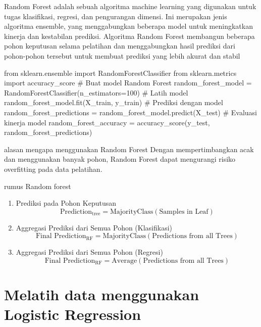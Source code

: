 \documentclass[
  letterpaper,
]{krantz}
\makeatletter
\newenvironment{Shaded}{\begin{snugshade}}{\end{snugshade}}
\newcommand{\CommentTok}[1]{\textcolor[rgb]{0.37,0.37,0.37}{#1}}
\newcommand{\DecValTok}[1]{\textcolor[rgb]{0.68,0.00,0.00}{#1}}
\newcommand{\ImportTok}[1]{\textcolor[rgb]{0.00,0.46,0.62}{#1}}
\newcommand{\NormalTok}[1]{\textcolor[rgb]{0.00,0.23,0.31}{#1}}
\newcommand{\OperatorTok}[1]{\textcolor[rgb]{0.37,0.37,0.37}{#1}}
\newenvironment{kframe}{%
\medskip{}
\setlength{\fboxsep}{.8em}
 \def\at@end@of@kframe{}%
 \ifinner\ifhmode%
  \def\at@end@of@kframe{\end{minipage}}%
  \begin{minipage}{\columnwidth}%
 \fi\fi%
 \def\FrameCommand##1{\hskip\@totalleftmargin \hskip-\fboxsep
 \colorbox{shadecolor}{##1}\hskip-\fboxsep
     \hskip-\linewidth \hskip-\@totalleftmargin \hskip\columnwidth}%
 \MakeFramed {\advance\hsize-\width
   \@totalleftmargin\z@ \linewidth\hsize
   \@setminipage}}%
 {\par\unskip\endMakeFramed%
 \at@end@of@kframe}
\renewenvironment{Shaded}{\begin{kframe}}{\end{kframe}}
\makeatother
\begin{document}
Random Forest adalah sebuah algoritma machine learning yang digunakan
untuk tugas klasifikasi, regresi, dan pengurangan dimensi. Ini merupakan
jenis algoritma ensemble, yang menggabungkan beberapa model untuk
meningkatkan kinerja dan kestabilan prediksi. Algoritma Random Forest
membangun beberapa pohon keputusan selama pelatihan dan menggabungkan
hasil prediksi dari pohon-pohon tersebut untuk membuat prediksi yang
lebih akurat dan stabil

\begin{Shaded}
\begin{Highlighting}[]
\ImportTok{from}\NormalTok{ sklearn.ensemble }\ImportTok{import}\NormalTok{ RandomForestClassifier}
\ImportTok{from}\NormalTok{ sklearn.metrics }\ImportTok{import}\NormalTok{ accuracy\_score}
\CommentTok{\# Buat model Random Forest}
\NormalTok{random\_forest\_model }\OperatorTok{=}\NormalTok{ RandomForestClassifier(n\_estimators}\OperatorTok{=}\DecValTok{100}\NormalTok{)}
\CommentTok{\# Latih model}
\NormalTok{random\_forest\_model.fit(X\_train, y\_train)}
\CommentTok{\# Prediksi dengan model}
\NormalTok{random\_forest\_predictions }\OperatorTok{=}\NormalTok{ random\_forest\_model.predict(X\_test)}
\CommentTok{\# Evaluasi kinerja model}
\NormalTok{random\_forest\_accuracy }\OperatorTok{=}\NormalTok{ accuracy\_score(y\_test, random\_forest\_predictions)}
\end{Highlighting}
\end{Shaded}

alasan mengapa menggunakan Random Forest Dengan mempertimbangkan acak
dan menggunakan banyak pohon, Random Forest dapat mengurangi risiko
overfitting pada data pelatihan.

rumus Random forest

\begin{enumerate}
\def\labelenumi{\arabic{enumi}.}
\item
  Prediksi pada Pohon Keputusan \[
  \text{Prediction}_{\text{tree}} = \text{MajorityClass}(\text{Samples in Leaf})
  \]
\item
  Aggregasi Prediksi dari Semua Pohon (Klasifikasi) \[
  \text{Final Prediction}_{\text{RF}} = \text{MajorityClass}(\text{Predictions from all Trees})
  \]
\item
  Aggregasi Prediksi dari Semua Pohon (Regresi) \[
  \text{Final Prediction}_{\text{RF}} = \text{Average}(\text{Predictions from all Trees})
  \]
\end{enumerate}

\hypertarget{melatih-data-menggunakan-logistic-regression}{%
\section*{Melatih data menggunakan Logistic
Regression}\label{melatih-data-menggunakan-logistic-regression}}
\end{document}
